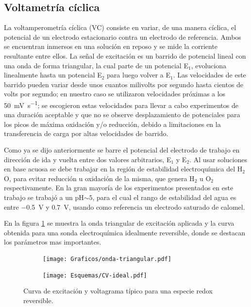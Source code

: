 		\pagebreak
			   		  	
	 \subsection{Voltametría cíclica}
	 		
	 		La voltamperometría cíclica (VC) consiste en variar, de una manera cíclica, el potencial de un electrodo estacionario contra un electrodo de referencia. Ambos se encuentran inmersos en una solución en reposo y se mide la corriente resultante entre ellos. La señal de excitación es un barrido de potencial lineal con una onda de forma triangular, la cual parte de un potencial E$_1$, evoluciona linealmente hasta un potencial E$_2$ para luego volver a E$_1$. Las velocidades de este barrido pueden variar desde unos cuantos milivolts por segundo hasta cientos de volts por segundo; en nuestro caso se utilizaron velocidades próximas a los \SI{50}{\milli\volt.\second^{-1}}; se escogieron estas velocidades para llevar a cabo experimentos de una duración aceptable y que no se observe desplazamiento de potenciales para los picos de máxima oxidación y/o reducción, debido a limitaciones en la transferencia de carga por altas velocidades de barrido. \cite{nicholson1964,Gewirth2004}

	 		Como ya se dijo anteriormente se barre el potencial del electrodo de trabajo en dirección de ida y vuelta entre dos valores arbitrarios, E$_1$ y E$_2$. Al usar soluciones en base acuosa se debe trabajar en la región de estabilidad electroquímica del H$_2$O, para evitar reducción u oxidación de la misma, que genera H$_2$ u O$_2$ respectivamente. En la gran mayoría de los experimentos presentados en este trabajo se trabajó a un pH$\sim 5$, para el cual el rango de estabilidad del agua es entre \SI{-0.5}{\volt} y \SI{0.7}{\volt}, usando como referencia un electrodo saturado de calomel.\cite{wang2014} 

	 		En la figura \ref{fig:CV_ideal} se muestra la onda triangular de excitación aplicada y la curva obtenida para una sonda electroquímica idealmente reversible, donde se destacan los parámetros mas importantes.
	 			 \begin{figure}[ht]
			  		  \begin{subfigure}[t]{0.495\textwidth}
			  		  \texttt{[image: Graficos/onda-triangular.pdf]}
			  		  \end{subfigure}
			  		  \begin{subfigure}[t]{0.495\textwidth}
			  		  \texttt{[image: Esquemas/CV-ideal.pdf]}
			  		  \end{subfigure}
			  		  \caption[Voltamperometria ideal reversible]{Curva de excitación y voltagrama típico para una especie redox reversible.}
			  		  \label{fig:CV_ideal}
			  		  \end{figure}

